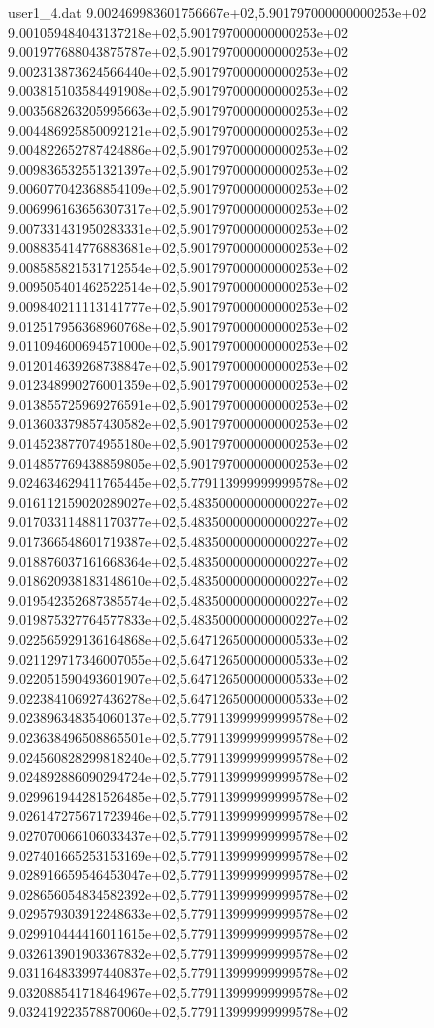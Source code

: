\begin{filecontents}{user1_4.dat}
9.002469983601756667e+02,5.901797000000000253e+02
9.001059484043137218e+02,5.901797000000000253e+02
9.001977688043875787e+02,5.901797000000000253e+02
9.002313873624566440e+02,5.901797000000000253e+02
9.003815103584491908e+02,5.901797000000000253e+02
9.003568263205995663e+02,5.901797000000000253e+02
9.004486925850092121e+02,5.901797000000000253e+02
9.004822652787424886e+02,5.901797000000000253e+02
9.009836532551321397e+02,5.901797000000000253e+02
9.006077042368854109e+02,5.901797000000000253e+02
9.006996163656307317e+02,5.901797000000000253e+02
9.007331431950283331e+02,5.901797000000000253e+02
9.008835414776883681e+02,5.901797000000000253e+02
9.008585821531712554e+02,5.901797000000000253e+02
9.009505401462522514e+02,5.901797000000000253e+02
9.009840211113141777e+02,5.901797000000000253e+02
9.012517956368960768e+02,5.901797000000000253e+02
9.011094600694571000e+02,5.901797000000000253e+02
9.012014639268738847e+02,5.901797000000000253e+02
9.012348990276001359e+02,5.901797000000000253e+02
9.013855725969276591e+02,5.901797000000000253e+02
9.013603379857430582e+02,5.901797000000000253e+02
9.014523877074955180e+02,5.901797000000000253e+02
9.014857769438859805e+02,5.901797000000000253e+02
9.024634629411765445e+02,5.779113999999999578e+02
9.016112159020289027e+02,5.483500000000000227e+02
9.017033114881170377e+02,5.483500000000000227e+02
9.017366548601719387e+02,5.483500000000000227e+02
9.018876037161668364e+02,5.483500000000000227e+02
9.018620938183148610e+02,5.483500000000000227e+02
9.019542352687385574e+02,5.483500000000000227e+02
9.019875327764577833e+02,5.483500000000000227e+02
9.022565929136164868e+02,5.647126500000000533e+02
9.021129717346007055e+02,5.647126500000000533e+02
9.022051590493601907e+02,5.647126500000000533e+02
9.022384106927436278e+02,5.647126500000000533e+02
9.023896348354060137e+02,5.779113999999999578e+02
9.023638496508865501e+02,5.779113999999999578e+02
9.024560828299818240e+02,5.779113999999999578e+02
9.024892886090294724e+02,5.779113999999999578e+02
9.029961944281526485e+02,5.779113999999999578e+02
9.026147275671723946e+02,5.779113999999999578e+02
9.027070066106033437e+02,5.779113999999999578e+02
9.027401665253153169e+02,5.779113999999999578e+02
9.028916659546453047e+02,5.779113999999999578e+02
9.028656054834582392e+02,5.779113999999999578e+02
9.029579303912248633e+02,5.779113999999999578e+02
9.029910444416011615e+02,5.779113999999999578e+02
9.032613901903367832e+02,5.779113999999999578e+02
9.031164833997440837e+02,5.779113999999999578e+02
9.032088541718464967e+02,5.779113999999999578e+02
9.032419223578870060e+02,5.779113999999999578e+02

\end{filecontents}
